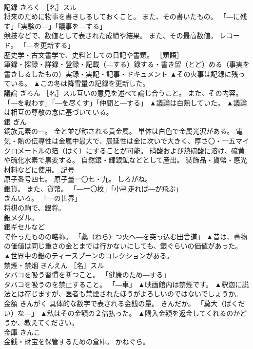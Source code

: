 \documentclass[8pt]{extreport}
\begin{document}
\begin{CJK}{UTF8}{min}
\\	記録	きろく	［名］スル 
\\	将来のために物事を書きしるしておくこと。 また、その書いたもの。 「―に残す」「実験の―」「議事を―する」 
\\	競技などで、数値として表された成績や結果。 また、その最高数値。 レコード。 「―を更新する」 
\\	歴史学・古文書学で、史料としての日記や書類。 ［類語］
\\	筆録・採録・詳録・登録・記載（―する）録する・書き留（とど）める（事実を書きしるしたもの）実録・実記・記事・ドキュメント	▲その火事は記録に残っている。 ▲この冬は降雪量の記録を更新した。
\\	議論	ぎろん	［名］スル互いの意見を述べて論じ合うこと。 また、その内容。 「―を戦わす」「―を尽くす」「仲間と―する」	▲議論は白熱していた。 ▲議論は相互の尊敬の念に基づいている。
\\	銀	ぎん	
\\	銅族元素の一。 金と並び称される貴金属。 単体は白色で金属光沢がある。 電気・熱の伝導性は金属中最大で、展延性は金に次いで大きく、厚さ〇・一五マイクロメートルの箔（はく）にすることが可能。 硝酸および熱硫酸に溶け、硫黄や硫化水素で黒変する。 自然銀・輝銀鉱などとして産出。 装飾品・貨幣・感光材料などに使用。 記号
\\	原子番号四七。 原子量一〇七・九。 しろがね。 
\\	銀貨。 また、貨幣。 「―一〇枚」「小判走れば―が飛ぶ」 
\\	ぎんいろ。 「―の世界」 
\\	将棋の駒で、銀将。 
\\	銀メダル。 
\\	銀ギセルなど 
\\	で作ったものの略称。 「藁（わら）つ火へ―を突っ込む田舎道」	▲昔は、書物の価値は同じ重さの金とまでは行かないにしても、銀ぐらいの価値があった。 ▲世界中の銀のティースプーンのコレクションがある。
\\	禁煙・禁烟	きんえん	［名］スル 
\\	タバコを吸う習慣を断つこと。 「健康のため―する」 
\\	タバコを吸うのを禁止すること。 「―車」	▲映画館内は禁煙です。 ▲釈迦に説法とは存じますが、医者も禁煙されたほうがよろしいのではないでしょうか。
\\	金額	きんがく	具体的な数字で表される金銭の量。 きんだか。 「莫大（ばくだい）な―」	▲私はその金額の２倍払った。 ▲購入金額を返金してくれるのかどうか、教えてください。
\\	金庫	きんこ	
\\	金銭・財宝を保管するための倉庫。 かねぐら。 

\end{CJK}
\end{document}
